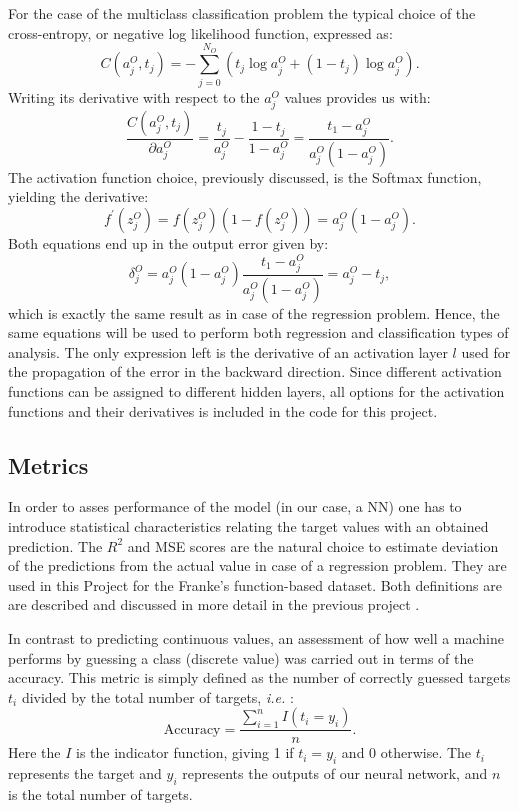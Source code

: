 \documentclass{emulateapj}
\begin{document}
 For the case of the multiclass classification problem the typical choice of the cross-entropy, or negative log likelihood function, expressed as:
 \begin{equation}
     C(a_j^O, t_j)=-\sum_{j=0}^{N_O}\left(t_j\log{a_j^O}+(1-t_j)\log{a_j^O}\right).
 \end{equation}
 Writing its derivative with respect to the $a_j^O$ values provides us with:
  \begin{equation}
     \frac{C(a_j^O, t_j)}{\partial a_{j}^O}=\frac{t_j}{a_j^O}-\frac{1-t_j}{1-a_j^O}=\frac{t_1-a_j^O}{a_j^O(1-a_j^O)}.
 \end{equation}
 The activation function choice, previously discussed, is the Softmax function, yielding the derivative:
 \begin{equation}
     f^{\prime}(z_j^O)=f(z_j^O)(1-f(z_j^O))= a_j^O(1-a_j^O).
 \end{equation}
 Both equations end up in the output error given by:
 \begin{equation}
     \delta_j^O=a_j^O(1-a_j^O)\frac{t_1-a_j^O}{a_j^O(1-a_j^O)}=a_{j}^O-t_j,
 \end{equation}
 which is exactly the same result as in case of the regression problem. Hence, the same equations will be used to perform both regression and classification types of analysis. The only expression left is the derivative of an activation layer $l$ used for the propagation of the error in the backward direction. Since different activation functions can be assigned to different hidden layers, all options for the activation functions and their derivatives is included in the code for this project.
 
 \subsection{Metrics}\label{subsec: metrics}
 
 In order to asses performance of the model (in our case, a NN) one has to introduce statistical characteristics relating the target values with an obtained prediction. The $R^2$ and MSE scores are the natural choice to estimate deviation of the predictions from the actual value in case of a regression problem. They are used in this Project for the Franke's function-based dataset. Both definitions are are described and discussed in more detail in the previous project \cite{proj1, proj1_2}.
 
In contrast to predicting continuous values, an assessment of how well a machine performs by guessing a class (discrete value) was carried out in terms of the accuracy. This metric is simply defined as the number of correctly guessed targets $t_i$ divided by the total number of targets, \textit{i.e.} \cite{Morten}:
 \begin{equation}
     \mathrm{Accuracy} = \frac{\sum_{i=1}^{n} I(t_i = y_i)}{n}.
 \end{equation}
 Here the $I$ is the indicator function, giving 1 if $t_i = y_i$ and $0$ otherwise. The $t_i$ represents the target and $y_i$ represents the outputs of our neural network, and $n$ is the total number of targets.
 
\end{document}
